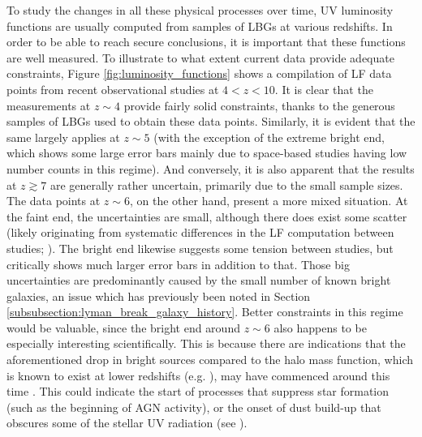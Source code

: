 To study the changes in all these physical processes over time, UV luminosity functions are usually computed from samples of LBGs at various redshifts. In order to be able to reach secure conclusions, it is important that these functions are well measured. To illustrate to what extent current data provide adequate constraints, Figure \ref{fig:luminosity_functions} shows a compilation of LF data points from recent observational studies at $4<z<10$. It is clear that the measurements at $z\sim4$ provide fairly solid constraints, thanks to the generous samples of LBGs used to obtain these data points. Similarly, it is evident that the same largely applies at $z\sim5$ (with the exception of the extreme bright end, which shows some large error bars mainly due to space-based studies having low number counts in this regime). And conversely, it is also apparent that the results at $z\gtrsim7$ are generally rather uncertain, primarily due to the small sample sizes. The data points at $z\sim6$, on the other hand, present a more mixed situation. At the faint end, the uncertainties are small, although there does exist some scatter (likely originating from systematic differences in the LF computation between studies; \citealt{2016PASA...33...37F}). The bright end likewise suggests some tension between studies, but critically shows much larger error bars in addition to that. Those big uncertainties are predominantly caused by the small number of known bright galaxies, an issue which has previously been noted in Section \ref{subsubsection:lyman_break_galaxy_history}. Better constraints in this regime would be valuable, since the bright end around $z\sim6$ also happens to be especially interesting scientifically. This is because there are indications that the aforementioned drop in bright sources compared to the halo mass function, which is known to exist at lower redshifts (e.g. \citealt{2010A&A...523A..74V}), may have commenced around this time \citep{2014MNRAS.440.2810B,2015MNRAS.452.1817B}. This could indicate the start of processes that suppress star formation (such as the beginning of AGN activity), or the onset of dust build-up that obscures some of the stellar UV radiation (see \citealt{2012ApJ...756..164F,2014ApJ...793..115B,2014MNRAS.440.3714R}). \par 



